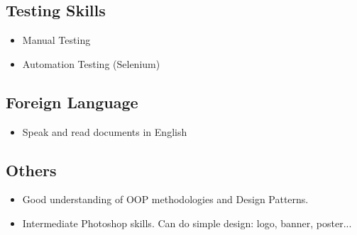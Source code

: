 \begin{cventries}
\begin{row}[cellsep=0.75cm]{3}{3}
    \begin{cell}{1}
	\section*{Testing Skills}
	\vspace{-1.5ex}
    \begin{itemize}
        \item {Manual Testing}
        \item {Automation Testing (Selenium)}
    \end{itemize}
	\end{cell}
    \begin{cell}{1}
	\section*{Foreign Language}
	\vspace{-1.5ex}
    \begin{itemize}
        \item {Speak and read documents in English}
    \end{itemize}
	\end{cell}
	\begin{cell}{1}
	\section*{Others}
	\vspace{-1.5ex}
    \begin{itemize}
        \item {Good understanding of OOP methodologies and Design Patterns.}
        \item {Intermediate Photoshop skills. Can do simple design: logo, banner, poster...}
    \end{itemize}
	\end{cell}
\end{row}

\end{cventries}
